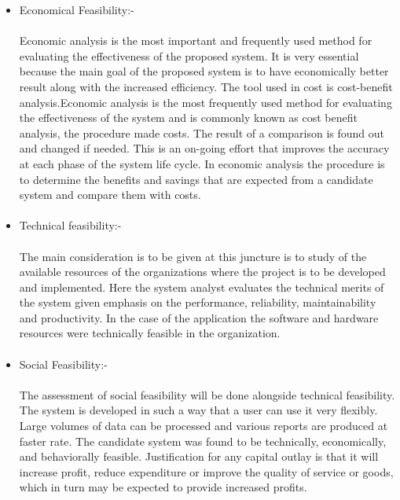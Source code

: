 \documentclass[a4paper, 12pt]{report}
\begin{document}
\begin{itemize}
\item Economical Feasibility:-
\paragraph{}Economic analysis is the most important and frequently used method for evaluating the
effectiveness of the proposed system. It is very essential because the main goal of the
proposed system is to have economically better result along with the increased efficiency.
The tool used in cost is cost-benefit analysis.Economic analysis is the most frequently used method for evaluating the effectiveness of the system
and is commonly known as cost benefit analysis, the procedure made costs. The result of a comparison
is found out and changed if needed. This is an on-going effort that improves the accuracy at each phase
of the system life cycle. In economic analysis the procedure is to determine the benefits and
savings that are expected from a candidate system and compare them with costs.
\paragraph{}
\newpage
\item Technical feasibility:-
\paragraph{}The main consideration is to be given at this juncture is to study of the available
resources of the organizations where the project is to be developed and implemented. Here
the system analyst evaluates the technical merits of the system given emphasis on the
performance, reliability, maintainability and productivity. In the case of the application the
software and hardware resources were technically feasible in the organization.
\paragraph{}
\item Social Feasibility:-
\paragraph{}The assessment of social feasibility will be done alongside technical feasibility. The
system is developed in such a way that a user can use it very flexibly. Large volumes of data
can be processed and various reports are produced at faster rate. The candidate system was
found to be technically, economically, and behaviorally feasible. Justification for any capital
outlay is that it will increase profit, reduce expenditure or improve the quality of service or
goods, which in turn may be expected to provide increased profits.

\end{itemize}
\end{document}
